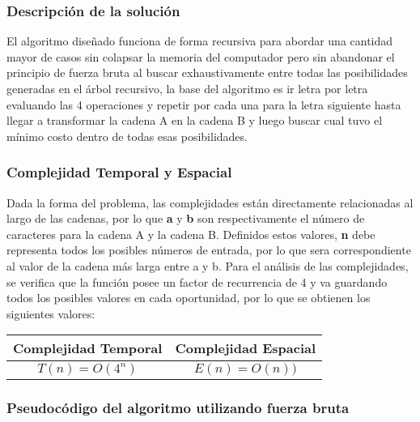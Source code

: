 
\subsubsection{Descripción de la solución}

El algoritmo diseñado funciona de forma recursiva para abordar una cantidad mayor de casos sin colapsar la memoria del computador pero sin abandonar el principio de fuerza bruta al buscar exhaustivamente entre todas las posibilidades generadas en el árbol recursivo, la base del algoritmo es ir letra por letra evaluando las 4 operaciones y repetir por cada una para la letra siguiente hasta llegar a transformar la cadena A en la cadena B y luego buscar cual tuvo el mínimo costo dentro de todas esas posibilidades.

\subsubsection{Complejidad Temporal y Espacial}

Dada la forma del problema, las complejidades están directamente relacionadas al largo de las cadenas, por lo que \textbf{a} y \textbf{b} son respectivamente el número de caracteres para la cadena A y la cadena B. Definidos estos valores, \textbf{n} debe representa todos los posibles números de entrada, por lo que sera correspondiente al valor de la cadena más larga entre a y b. Para el análisis de las complejidades, se verifica que la función posee un factor de recurrencia de 4 y va guardando todos los posibles valores en cada oportunidad, por lo que se obtienen los siguientes valores:
\begin{center}
\begin{tabular}{c|c}
\textbf{Complejidad Temporal} & \textbf{Complejidad Espacial} \\ \hline
$T(n) = O(4^{n})$ & $E(n) = O(n))$
\end{tabular}
\end{center}

\subsubsection{Pseudocódigo del algoritmo utilizando fuerza bruta}

